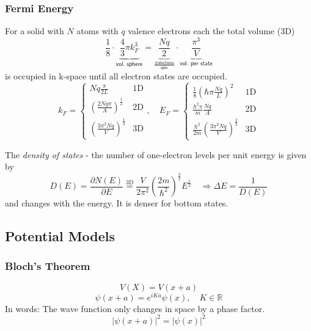 \subsubsection{Fermi Energy}
For a solid with $N$ atoms with $q$ valence electrons each the total volume (3D)
\noindent\begin{equation*}
    \frac{1}{8}\cdot\underbrace{\frac{4}{3}\pi k_F^3}_{\textsf{vol. sphere}} = \underbrace{\frac{Nq}{2}}_{\frac{\textsf{\# electrons}}{\mathsf{spin}}}\cdot \underbrace{\frac{\pi^3}{V}}_{\textsf{vol. per state}}
\end{equation*}
is occupied in k-space until all electron states are occupied.
\noindent\begin{equation*}
    k_F  = \begin{cases}
        Nq\frac{\pi}{2L}                                  & \mathrm{1D} \\
        {\left(\frac{2Nq\pi}{A}\right)}^\frac{1}{2}       & \mathrm{2D} \\
        {\left(\frac{3\pi^2 N q}{V}\right)}^{\frac{1}{3}} & \mathrm{3D}
    \end{cases}, \quad
    E_F  = \begin{cases}
        \frac{1}{8}{\left(\hbar \pi \frac{Nq}{L}\right)}^2                    & \mathrm{1D} \\
        \frac{\hbar^2 \pi}{m} \frac{Nq}{A}                                  & \mathrm{2D} \\
        \frac{\hbar^2}{2m}{\left(\frac{3\pi^2 N q}{V}\right)}^{\frac{2}{3}} & \mathrm{3D}
    \end{cases}
\end{equation*}

\newpar{}

The \textit{density of states} - the number of one-electron levels per unit energy is given by
\noindent\begin{equation*}
    D(E)=\frac{\partial N(E)}{\partial E} \overset{\mathrm{3D}}{=} \frac{V}{2\pi^2}{\left(\frac{2m}{\hbar^2}\right)}^{\frac{3}{2}} E^{\frac{1}{2}} \quad \Rightarrow \Delta E = \frac{1}{D(E)}
\end{equation*}
and changes with the energy. It is denser for bottom states.

\subsection{Potential Models}
\subsubsection{Bloch's Theorem}
\noindent\begin{equation*}
    V(X) = V(x+a)
\end{equation*}
\noindent\begin{equation*}
    \psi(x+a) = e^{iKa} \psi(x), \quad K\in \mathbb{R}
\end{equation*}
In words: The wave function only changes in space by a phase factor.
\noindent\begin{equation*}
    {|\psi(x+a)|}^2={|\psi(x)|}^2
\end{equation*}

